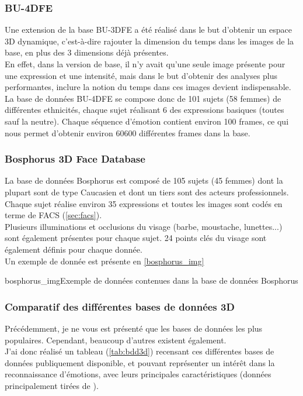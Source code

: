 \documentclass[poster]{polytech/polytech}
\begin{document}
\subsubsection{BU-4DFE}
Une extension de la base BU-3DFE a été réalisé dans le but d'obtenir un espace 3D dynamique, c'est-à-dire rajouter la dimension du temps dans les images de la base, en plus des 3 dimensions déjà présentes.\\
En effet, dans la version de base, il n'y avait qu'une seule image présente pour une expression et une intensité, mais dans le but d'obtenir des analyses plus performantes, inclure la notion du temps dans ces images devient indispensable.\\
La base de données BU-4DFE \cite{bu4dfe_article} se compose donc de 101 sujets (58 femmes) de différentes ethnicités, chaque sujet réalisant 6 des expressions basiques (toutes sauf la neutre). Chaque séquence d'émotion contient environ 100 frames, ce qui nous permet d'obtenir environ 60600 différentes frames dans la base.

\subsubsection{Bosphorus 3D Face Database}
La base de données Bosphorus \cite{bosphorus_article} est composé de 105 sujets (45 femmes) dont la plupart sont de type Caucasien et dont un tiers sont des acteurs professionnels.\\
Chaque sujet réalise environ 35 expressions et toutes les images sont codés en terme de FACS (\autoref{sec:facs}).\\
Plusieurs illuminations et occlusions du visage (barbe, moustache, lunettes...) sont également présentes pour chaque sujet. 24 points clés du visage sont également définis pour chaque donnée.\\
Un exemple de donnée est présente en \autoref{bosphorus_img}

\begin{Figure}{bosphorus_img}{Exemple de données contenues dans la base de données Bosphorus}
\end{Figure}

\subsubsection{Comparatif des différentes bases de données 3D}

Précédemment, je ne vous est présenté que les bases de données les plus populaires. Cependant, beaucoup d'autres existent également.\\
J'ai donc réalisé un tableau (\autoref{tab:bdd3d}) recensant ces différentes bases de données publiquement disponible, et pouvant représenter un intérêt dans la reconnaissance d'émotions, avec leurs principales caractéristiques (données principalement tirées de \cite{sota3d}).
\end{document}
